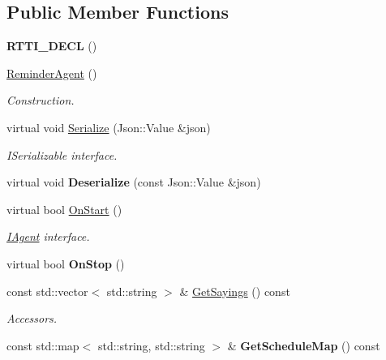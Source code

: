 \subsection*{Public Member Functions}
\begin{DoxyCompactItemize}
\item 
\mbox{\label{class_reminder_agent_aeac232dcf498a10c7d929639befb9362}} 
{\bfseries R\+T\+T\+I\+\_\+\+D\+E\+CL} ()
\item 
\mbox{\label{class_reminder_agent_a53d1e20857e828f7b2fdda0ac369e001}} 
\hyperlink{class_reminder_agent_a53d1e20857e828f7b2fdda0ac369e001}{Reminder\+Agent} ()
\begin{DoxyCompactList}\small\item\em Construction. \end{DoxyCompactList}\item 
\mbox{\label{class_reminder_agent_a02e7a24a16c8b920efe579369143028c}} 
virtual void \hyperlink{class_reminder_agent_a02e7a24a16c8b920efe579369143028c}{Serialize} (Json\+::\+Value \&json)
\begin{DoxyCompactList}\small\item\em I\+Serializable interface. \end{DoxyCompactList}\item 
\mbox{\label{class_reminder_agent_a1f509cb7a0cf3fdbe9caa3a6c4f3ad1b}} 
virtual void {\bfseries Deserialize} (const Json\+::\+Value \&json)
\item 
\mbox{\label{class_reminder_agent_aec341c8f936216a037fbe7abb7e05f96}} 
virtual bool \hyperlink{class_reminder_agent_aec341c8f936216a037fbe7abb7e05f96}{On\+Start} ()
\begin{DoxyCompactList}\small\item\em \hyperlink{class_i_agent}{I\+Agent} interface. \end{DoxyCompactList}\item 
\mbox{\label{class_reminder_agent_a85657909ccad1a9f5481ed9cd55ab1ff}} 
virtual bool {\bfseries On\+Stop} ()
\item 
\mbox{\label{class_reminder_agent_a63c329a5bda9614178b27bbd0c42464a}} 
const std\+::vector$<$ std\+::string $>$ \& \hyperlink{class_reminder_agent_a63c329a5bda9614178b27bbd0c42464a}{Get\+Sayings} () const
\begin{DoxyCompactList}\small\item\em Accessors. \end{DoxyCompactList}\item 
\mbox{\label{class_reminder_agent_ae1268b9ac1c57e775709b16c7ca7b4f8}} 
const std\+::map$<$ std\+::string, std\+::string $>$ \& {\bfseries Get\+Schedule\+Map} () const
\end{DoxyCompactItemize}
